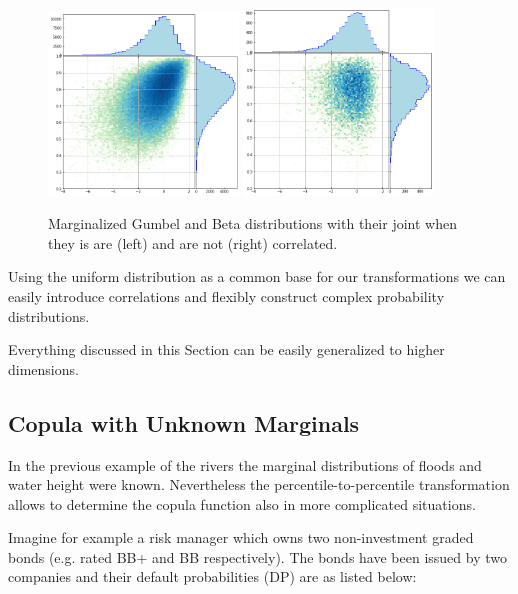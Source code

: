 \begin{figure}[htbp]
  \centering
  \includegraphics[width=0.45\textwidth]{figures/gumbel_vs_beta}
  \quad
  \includegraphics[width=0.45\textwidth]{figures/gumbel_vs_beta_corr}
  \caption{Marginalized Gumbel and Beta distributions with their joint when they is are (left) and are not (right) correlated.}
  \label{fig:gumbel_beta_with_corr}
\end{figure}
    
Using the uniform distribution as a common base for our transformations we can easily introduce correlations and flexibly construct complex probability distributions. 

Everything discussed in this Section can be easily generalized to higher dimensions.

\subsection{Copula with Unknown Marginals}
In the previous example of the rivers the marginal distributions of floods and water height were known. Nevertheless the percentile-to-percentile transformation allows to determine the copula function also in more complicated situations.

Imagine for example a risk manager which owns two non-investment graded bonds (e.g. rated BB+ and BB respectively). The bonds have been issued by two companies and their default probabilities (DP) are as listed below:

